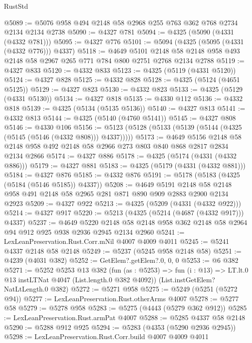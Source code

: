\begin{lexlean}{RustStd}
\begin{coremodule}
@5089 := @5076 @958 @494 @2148 @58 @2968 @255 @763 @362 @768 @2734 @2134 @2134 @2738
@5090 := @4327 @781
@5094 := @4325 (@5090 (@4331 (@4332 @781)))
@5095 := @4327 @776
@5101 := @5094 (@4325 (@5095 (@4331 (@4332 @776))) @4337)
@5118 := @4649
    @5101
    @2148
    @58
    @2148
    @958
    @493
    @2148
    @58
    @2967
    @265
    @771
    @784
    @800
    @2751
    @2768
    @2134
    @2788
@5119 := @4327 @833
@5120 := @4332 @833
@5123 := @4325 (@5119 (@4331 @5120))
@5124 := @4327 @828
@5125 := @4332 @828
@5128 := @4325 (@5124 (@4651 @5125))
@5129 := @4327 @823
@5130 := @4332 @823
@5133 := @4325 (@5129 (@4331 @5130))
@5134 := @4327 @818
@5135 := @4330 @112
@5136 := @4332 @818
@5139 := @4325 (@5134 (@5135 @5136))
@5140 := @4327 @813
@5141 := @4332 @813
@5144 := @4325 (@5140 (@4760 @5141))
@5145 := @4327 @808
@5146 := @4330 @106
@5156 := @5123 (@5128 (@5133 (@5139 (@5144 (@4325 (@5145 (@5146 (@4332 @808))) @4337)))))
@5173 := @4649
    @5156
    @2148
    @58
    @2148
    @958
    @492
    @2148
    @58
    @2966
    @273
    @803
    @840
    @868
    @2817
    @2834
    @2134
    @2866
@5174 := @4327 @886
@5178 := @4325 (@5174 (@4331 (@4332 @886)))
@5179 := @4327 @881
@5183 := @4325 (@5179 (@4331 (@4332 @881)))
@5184 := @4327 @876
@5185 := @4332 @876
@5191 := @5178 (@5183 (@4325 (@5184 (@5146 @5185)) @4337))
@5208 := @4649
    @5191
    @2148
    @58
    @2148
    @958
    @491
    @2148
    @58
    @2965
    @281
    @871
    @890
    @909
    @2883
    @2900
    @2134
    @2923
@5209 := @4327 @922
@5213 := @4325 (@5209 (@4331 (@4332 @922)))
@5214 := @4327 @917
@5220 := @5213 (@4325 (@5214 (@4687 (@4332 @917))) @4337)
@5237 := @4649
    @5220
    @2148
    @58
    @2148
    @958
    @362
    @2148
    @58
    @2964
    @94
    @912
    @925
    @938
    @2936
    @2945
    @2134
    @2960
@5241 := LexLeanPreservation.Rust.Corr.mNil @4007 @4009 @4011
@5245 := @5241 @4337 @2148 @58 @2148
@5249 := @5237 (@5245 @958 @2148 @58)
@5251 := @4239 (@4031 @382)
@5252 := GetElem?.getElem?.{0, 0, 0}
@5253 := @6 @382
@5271 := @5252
    @5253
    @13
    @382
    (fun (as : @5253) =>
    fun (i : @13) => LT.lt.{0} @13 instLTNat @4047 (List.length.{0} @382 @4092))
    (List.instGetElem?NatLtLength.{0} @382)
@5272 := @5271 @958
@5275 := @5249 (@5251 (@5272 @94))
@5277 := LexLeanPreservation.Rust.otherArms @4007
@5278 := @5277 @58
@5279 := @5278 @958
@5283 := @5275 (@4443 (@5279 @362 @912))
@5285 := LexLeanPreservation.Rust.armPat @4007
@5288 := @5285 @4337 @58 @2148
@5290 := @5288 @912 @925
@5294 := @5283 (@4353 (@5290 @2936 @2945))
@5298 := LexLeanPreservation.Rust.Corr.build @4007 @4009 @4011

\end{coremodule}
\end{lexlean}
